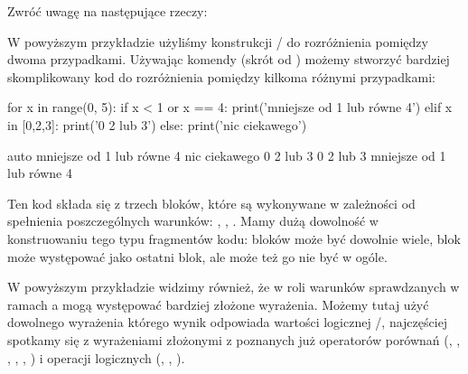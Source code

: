 \documentclass{pdfBooklets}
\begin{document}
\noindent Zwróć uwagę na następujące rzeczy:
W powyższym przykładzie użyliśmy konstrukcji / do rozróżnienia pomiędzy dwoma przypadkami.
Używając komendy  (skrót od ) możemy stworzyć bardziej skomplikowany kod do rozróżnienia pomiędzy kilkoma różnymi przypadkami:

\begin{CodeFrame}[python]{0.6\textwidth}
for x in range(0, 5):
    if x < 1 or x == 4:
        print('mniejsze od 1 lub równe 4')
    elif x in [0,2,3]:
        print('0 2 lub 3')
    else:
        print('nic ciekawego')
\end{CodeFrame}
\begin{CodeFrame}{auto}
mniejsze od 1 lub równe 4
nic ciekawego
0 2 lub 3
0 2 lub 3
mniejsze od 1 lub równe 4
\end{CodeFrame}

Ten kod składa się z trzech bloków, które są wykonywane w zależności od spełnienia poszczególnych warunków:
, , .
Mamy dużą dowolność w konstruowaniu tego typu fragmentów kodu: 
bloków  może być dowolnie wiele, blok  może występować jako ostatni blok,
ale może też go nie być w ogóle.

W powyższym przykładzie widzimy również, że w roli warunków sprawdzanych w ramach a mogą występować bardziej złożone wyrażenia.
Możemy tutaj użyć dowolnego wyrażenia którego wynik odpowiada wartości logicznej /,
najczęściej spotkamy się z wyrażeniami złożonymi z poznanych już operatorów porównań (\python{<}, \python{>}, \python{<=},
\python{>=}, \python{==}, \python{!=}) i operacji logicznych (, , ).
\end{document}
